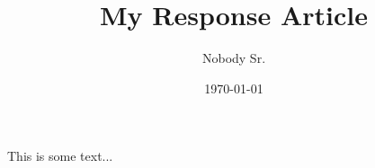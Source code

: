 \documentclass[11pt]{article}
\begin{document}
\title{My Response Article}
\author{Nobody Sr.}
\date{\today}
\maketitle

This is some text...
\end{document}
